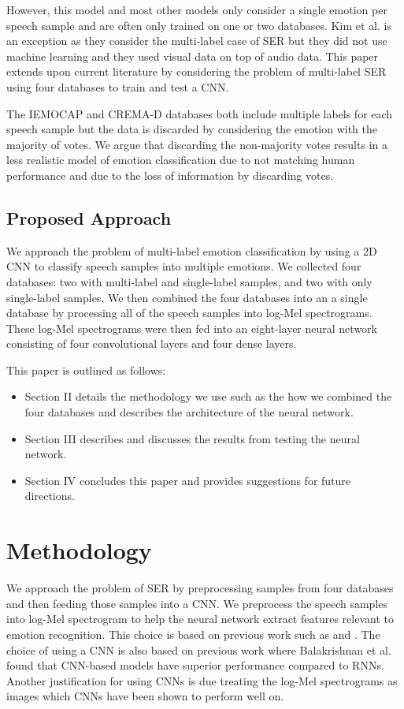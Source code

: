 However, this model and most other models only consider a single emotion per speech sample and are often only trained on one or two databases. Kim et al. \cite{Kim2018a} is an exception as they consider the multi-label case of SER but they did not use machine learning and they used visual data on top of audio data. This paper extends upon current literature by considering the problem of multi-label SER using four databases to train and test a CNN.

The IEMOCAP \cite{busso_2008} and CREMA-D \cite{cao_2014} databases both include multiple labels for each speech sample but the data is discarded by considering the emotion with the majority of votes. We argue that discarding the non-majority votes results in a less realistic model of emotion classification due to not matching human performance and due to the loss of information by discarding votes.

\subsection{Proposed Approach}

We approach the problem of multi-label emotion classification by using a 2D CNN to classify speech samples into multiple emotions. We collected four databases: two with multi-label and single-label samples, and two with only single-label samples. We then combined the four databases into an a single database by processing all of the speech samples into log-Mel spectrograms. These log-Mel spectrograms were then fed into an eight-layer neural network consisting of four convolutional layers and four dense layers.

This paper is outlined as follows:
\begin{itemize}
	\item Section II details the methodology we use such as the how we combined the four databases and describes the architecture of the neural network.
	\item Section III describes and discusses the results from testing the neural network.
	\item Section IV concludes this paper and provides suggestions for future directions.
\end{itemize}

\section{Methodology}

We approach the problem of SER by preprocessing samples from four databases and then feeding those samples into a CNN. We preprocess the speech samples into log-Mel spectrogram to help the neural network extract features relevant to emotion recognition. This choice is based on previous work such as \cite{Engel2019} and \cite{Badshah2017}. The choice of using a CNN is also based on previous work where Balakrishnan et al. \cite{Balakrishnan2017} found that CNN-based models have superior performance compared to RNNs. Another justification for using CNNs is due treating the log-Mel spectrograms as images which CNNs have been shown to perform well on.\cite{Krizhevsky2012}

